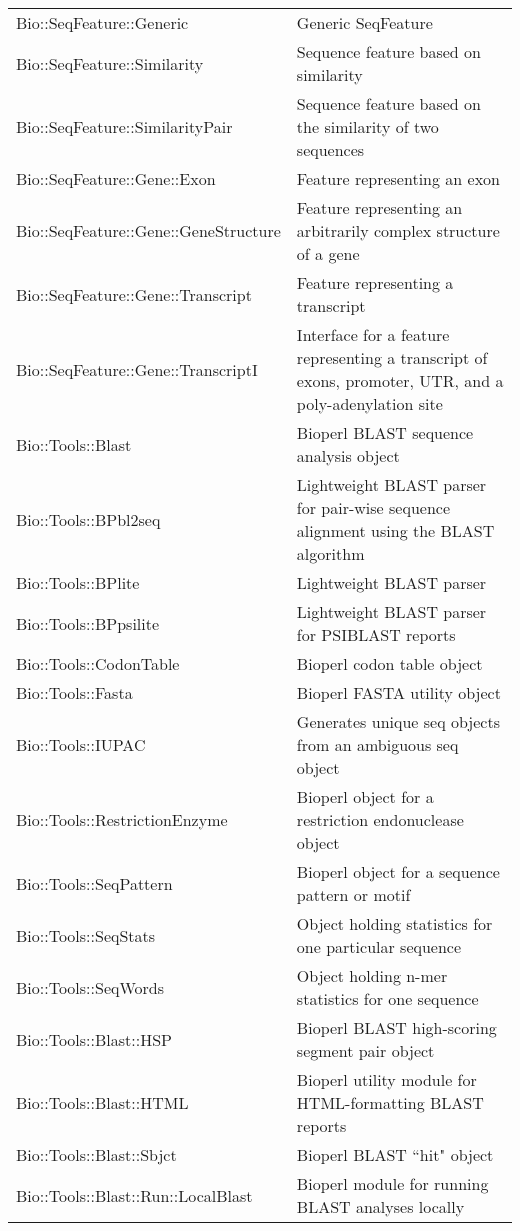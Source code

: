 \begin{table}[!htbp]
\begin{center}
\begin{tabu}{X[2,l]X[3,l]}
  Bio::SeqFeature::Generic & Generic SeqFeature\\
  Bio::SeqFeature::Similarity & Sequence feature based on similarity\\
  Bio::SeqFeature::SimilarityPair & Sequence feature based on the similarity of two sequences\\
  Bio::SeqFeature::Gene::Exon & Feature representing an exon\\
  Bio::SeqFeature::Gene::GeneStructure & Feature representing an arbitrarily complex structure of a gene\\
  Bio::SeqFeature::Gene::Transcript & Feature representing a transcript\\
  Bio::SeqFeature::Gene::TranscriptI & Interface for a feature representing a transcript of exons, promoter, UTR, and a poly-adenylation site\\
  Bio::Tools::Blast & Bioperl BLAST sequence analysis object\\
  Bio::Tools::BPbl2seq & Lightweight BLAST parser for pair-wise sequence alignment using the BLAST algorithm\\
  Bio::Tools::BPlite & Lightweight BLAST parser\\
  Bio::Tools::BPpsilite & Lightweight BLAST parser for PSIBLAST reports\\
  Bio::Tools::CodonTable & Bioperl codon table object\\
  Bio::Tools::Fasta & Bioperl FASTA utility object\\
  Bio::Tools::IUPAC & Generates unique seq objects from an ambiguous seq object\\
  Bio::Tools::RestrictionEnzyme & Bioperl object for a restriction endonuclease object\\
  Bio::Tools::SeqPattern & Bioperl object for a sequence pattern or motif\\
  Bio::Tools::SeqStats & Object holding statistics for one particular sequence\\
  Bio::Tools::SeqWords & Object holding n-mer statistics for one sequence\\
  Bio::Tools::Blast::HSP & Bioperl BLAST high-scoring segment pair object\\
  Bio::Tools::Blast::HTML & Bioperl utility module for HTML-formatting BLAST reports\\
  Bio::Tools::Blast::Sbjct & Bioperl BLAST ``hit" object\\
  Bio::Tools::Blast::Run::LocalBlast & Bioperl module for running BLAST analyses locally\\

\end{tabu}
\end{center}
\end{table}
